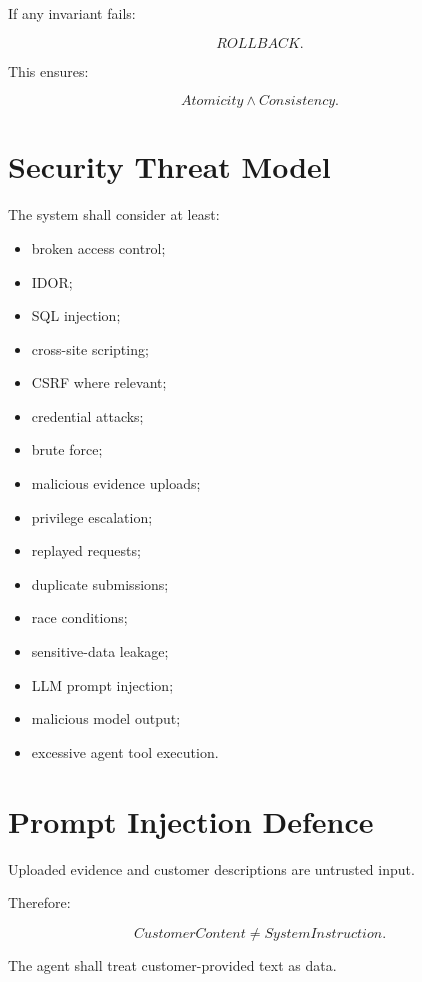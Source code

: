 \documentclass[11pt,a4paper]{article}
\begin{document}
If any invariant fails:

\[
ROLLBACK.
\]

This ensures:

\[
Atomicity
\land
Consistency.
\]

\section{Security Threat Model}

The system shall consider at least:

\begin{itemize}
    \item broken access control;
    \item IDOR;
    \item SQL injection;
    \item cross-site scripting;
    \item CSRF where relevant;
    \item credential attacks;
    \item brute force;
    \item malicious evidence uploads;
    \item privilege escalation;
    \item replayed requests;
    \item duplicate submissions;
    \item race conditions;
    \item sensitive-data leakage;
    \item LLM prompt injection;
    \item malicious model output;
    \item excessive agent tool execution.
\end{itemize}

\section{Prompt Injection Defence}

Uploaded evidence and customer descriptions are untrusted input.

Therefore:

\[
CustomerContent
\neq
SystemInstruction.
\]

The agent shall treat customer-provided text as data.
\end{document}
